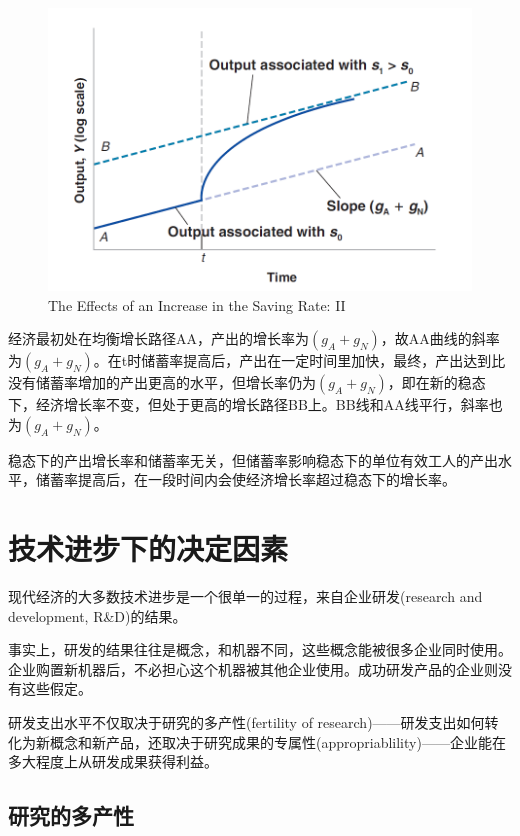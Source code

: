\documentclass{article}
\begin{document}
\begin{figure}[H] %
	\centering %
	\includegraphics[width=1\textwidth]{12_5} %
	\caption{The Effects of an Increase
		in the Saving Rate: II} %
	\label{Fig.main6} %
\end{figure}

经济最初处在均衡增长路径AA，产出的增长率为$ (g_A+g_N) $，故AA曲线的斜率为$ (g_A+g_N) $。在t时储蓄率提高后，产出在一定时间里加快，最终，产出达到比没有储蓄率增加的产出更高的水平，但增长率仍为$ (g_A+g_N) $，即在新的稳态下，经济增长率不变，但处于更高的增长路径BB上。BB线和AA线平行，斜率也为$ (g_A+g_N) $。

稳态下的产出增长率和储蓄率无关，但储蓄率影响稳态下的单位有效工人的产出水平，储蓄率提高后，在一段时间内会使经济增长率超过稳态下的增长率。

\section{技术进步下的决定因素}

现代经济的大多数技术进步是一个很单一的过程，来自企业研发(research and development, R\&D)的结果。

事实上，研发的结果往往是概念，和机器不同，这些概念能被很多企业同时使用。企业购置新机器后，不必担心这个机器被其他企业使用。成功研发产品的企业则没有这些假定。

研发支出水平不仅取决于研究的多产性(fertility of research)——研发支出如何转化为新概念和新产品，还取决于研究成果的专属性(appropriablility)——企业能在多大程度上从研发成果获得利益。

\subsection{研究的多产性}
\end{document}
